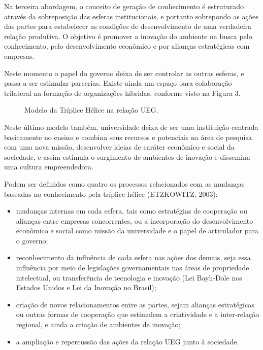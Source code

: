 Na terceira abordagem, o conceito de geração de conhecimento é estruturado através da sobreposição das esferas institucionais, e portanto sobrepondo as ações das partes para estabelecer as condições de desenvolvimento de uma verdadeira relação produtiva. O objetivo é promover a inovação do ambiente na busca pelo conhecimento, pelo desenvolvimento econômico e por alianças estratégicas com empresas.

Neste momento o papel do governo deixa de ser controlar as outras esferas, e passa a ser estimular parcerias. Existe ainda um espaço para colaboração trilateral na formação de organizações híbridas, conforme visto na Figura 3.


\begin{figure}[ht]
    \centering
    \caption{Modelo da Tríplice Hélice na relação UEG.}
    \label{crescimento_odf}
\end{figure}

Neste último modelo também, universidade deixa de ser uma instituição centrada basicamente no ensino e combina seus recursos e potenciais na área de pesquisa com uma nova missão, desenvolver ideias de caráter econômico e social da sociedade, e assim estimula o surgimento de ambientes de inovação e dissemina uma cultura empreendedora.

Podem ser definidos como quatro os processos relacionados com as mudanças baseadas no conhecimento pela tríplice hélice (ETZKOWITZ, 2003):

\begin{itemize}
  \item{mudanças internas em cada esfera, tais como estratégias de cooperação ou alianças entre empresas concorrentes, ou a incorporação do desenvolvimento econômico e social como missão da universidade e o papel de articulador para o governo;}
  \item{reconhecimento da influência de cada esfera nas ações dos demais, seja essa influência por meio de legislações governamentais nas áreas de propriedade intelectual, ou transferência de tecnologia e inovação (Lei Bayh-Dole nos Estados Unidos e Lei da Inovação no Brasil);}
  \item{criação de novos relacionamentos entre as partes, sejam alianças estratégicas ou outras formas de cooperação que estimulem a criatividade e a inter-relação regional, e ainda a criação de ambientes de inovação;}
  \item{a ampliação e repercussão das ações da relação UEG junto à sociedade.}
\end{itemize}

